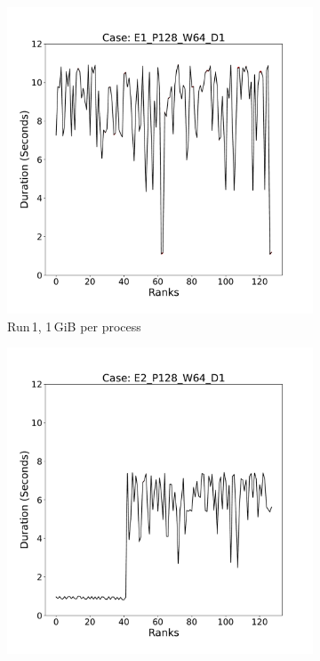 \begin{figure}[h!]
     \centering
    \begin{subfigure}[b]{0.3\textwidth}
         \centering
         \includegraphics[width=\textwidth, height=\textwidth]{figures/E1_P128_W64_D1.pdf}
         \caption{Run\,1, 1\,GiB per process}
         \label{fig:E1_1_d3}
     \end{subfigure}
     \hfill
     \begin{subfigure}[b]{0.3\textwidth}
         \centering
         \includegraphics[width=\textwidth, height=\textwidth]{figures/E2_P128_W64_D1.pdf}

\end{subfigure}
\end{figure}
